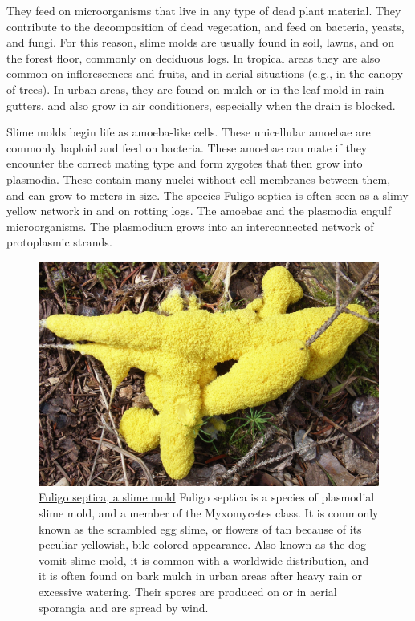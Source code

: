 They feed on microorganisms that live in any type of dead plant material. They contribute to the decomposition of dead vegetation, and feed on bacteria, yeasts, and fungi. For this reason, slime molds are usually found in soil, lawns, and on the forest floor, commonly on deciduous logs. In tropical areas they are also common on inflorescences and fruits, and in aerial situations (e.g., in the canopy of trees). In urban areas, they are found on mulch or in the leaf mold in rain gutters, and also grow in air conditioners, especially when the drain is blocked.

Slime molds begin life as amoeba-like cells. These unicellular amoebae are commonly haploid and feed on bacteria. These amoebae can mate if they encounter the correct mating type and form zygotes that then grow into plasmodia. These contain many nuclei without cell membranes between them, and can grow to meters in size. The species Fuligo septica is often seen as a slimy yellow network in and on rotting logs. The amoebae and the plasmodia engulf microorganisms. The plasmodium grows into an interconnected network of protoplasmic strands.



\begin{figure}

{\centering \includegraphics[width=0.7\linewidth]{./figures/protista/Fuligo_septica_bl1} 

}

\caption{\href{https://commons.wikimedia.org/wiki/File:Fuligo_septica_bl1.JPG}{Fuligo septica, a slime mold} Fuligo septica is a species of plasmodial slime mold, and a member of the Myxomycetes class. It is commonly known as the scrambled egg slime, or flowers of tan because of its peculiar yellowish, bile-colored appearance. Also known as the dog vomit slime mold, it is common with a worldwide distribution, and it is often found on bark mulch in urban areas after heavy rain or excessive watering. Their spores are produced on or in aerial sporangia and are spread by wind.}\label{fig:fuligo}
\end{figure}

